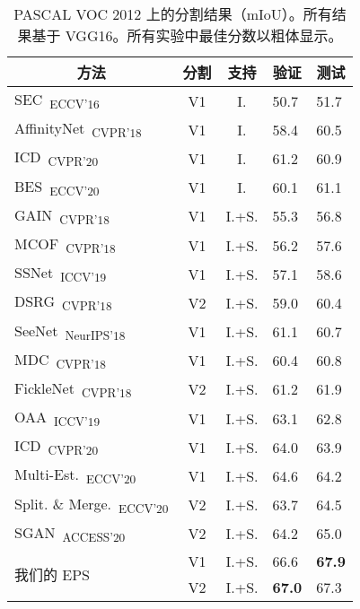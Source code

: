 \begin{table}[]
\normalsize
\centering
{\small
\begin{tabular}{@{}lccll@{}}
\toprule
\multicolumn{1}{c}{方法} & 分割 & 支持 & \multicolumn{1}{c}{验证} & \multicolumn{1}{c}{测试} \\ \midrule
\multicolumn{1}{l}{SEC~\cite{kolesnikov2016seed}\textsubscript{ECCV'16}} & V1 & I. & 50.7 & 51.7 \\
\multicolumn{1}{l}{AffinityNet~\cite{ahn2018learning}\textsubscript{CVPR'18}} & V1 & I. & 58.4 & 60.5 \\
\multicolumn{1}{l}{ICD~\cite{fan2020learning}\textsubscript{CVPR'20}} & V1 & I. & 61.2 & 60.9 \\
\multicolumn{1}{l}{BES~\cite{chen2020boundary}\textsubscript{ECCV'20}} & V1 & I. & 60.1 & 61.1 \\
\multicolumn{1}{l}{GAIN~\cite{li2018tell}\textsubscript{CVPR'18}} & V1 & I.+S. & 55.3 & 56.8 \\
\multicolumn{1}{l}{MCOF~\cite{wang2018weakly}\textsubscript{CVPR'18}} & V1 & I.+S. & 56.2 & 57.6 \\
\multicolumn{1}{l}{SSNet~\cite{zeng2019joint}\textsubscript{ICCV'19}} & V1 & I.+S. & 57.1 & 58.6 \\
\multicolumn{1}{l}{DSRG~\cite{huang2018weakly}\textsubscript{CVPR'18}} & V2 & I.+S. & 59.0 & 60.4 \\
\multicolumn{1}{l}{SeeNet~\cite{hou2018self}\textsubscript{NeurIPS'18}} & V1 & I.+S. & 61.1 & 60.7 \\
\multicolumn{1}{l}{MDC~\cite{wei2018revisiting}\textsubscript{CVPR'18}} & V1 & I.+S. & 60.4 & 60.8 \\
\multicolumn{1}{l}{FickleNet~\cite{lee2019ficklenet}\textsubscript{CVPR'18}} & V2 & I.+S. & 61.2 & 61.9 \\
\multicolumn{1}{l}{OAA~\cite{jiang2019integral}\textsubscript{ICCV'19}} & V1 & I.+S. & 63.1 & 62.8 \\
\multicolumn{1}{l}{ICD~\cite{fan2020learning}\textsubscript{CVPR'20}} & V1 & I.+S. & 64.0 & 63.9 \\
\multicolumn{1}{l}{Multi-Est.~\cite{fan2020employing}\textsubscript{ECCV'20}} & V1 & I.+S. & 64.6 & 64.2 \\
\multicolumn{1}{l}{Split. \& Merge.~\cite{zhang2020splitting}\textsubscript{ECCV'20}} & V2 & I.+S. & 63.7 & 64.5 \\
\multicolumn{1}{l}{SGAN~\cite{yao2020saliency}\textsubscript{ACCESS'20}} & V2 & I.+S. & 64.2 & 65.0 \\ \midrule
\multicolumn{1}{l}{\multirow{2}{*}{我们的 EPS}} & V1 & I.+S. & 66.6 & \textbf{67.9} \\
\multicolumn{1}{l}{} & V2 & I.+S. & \textbf{67.0} & 67.3 \\ \bottomrule

\end{tabular}
}
\vspace{2mm}
\caption{PASCAL VOC 2012 上的分割结果（mIoU）。所有结果基于 VGG16。所有实验中最佳分数以粗体显示。}\vspace{-3mm}
\label{tab:seg_quan_voc_vgg16}
\end{table}
